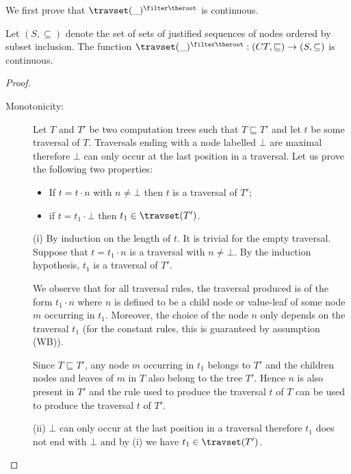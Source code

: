 We first prove that $\travset(\_)^{\filter \theroot}$ is continuous.
\begin{lemma}
\label{lem:travred_continuous} Let $(S,\subseteq)$ denote the set of
sets of justified sequences of nodes ordered by subset inclusion.
The function $\travset(\_)^{\filter \theroot} : (CT,\sqsubseteq)
\rightarrow (S,\subseteq)$ is continuous.
\end{lemma}
\begin{proof} \
    \begin{description}
    \item[Monotonicity:] Let $T$ and $T'$ be two computation trees such that $T \sqsubseteq T'$
    and let $t$ be some traversal of $T$.
    Traversals ending with a node labelled $\bot$ are maximal therefore $\bot$ can only occur
    at the last position in a traversal. Let us prove the following two properties:
        \begin{itemize}
            \item[(i)]  If $t = t \cdot n$ with $n\neq \bot$ then $t$ is a traversal of $T'$;
            \item[(ii)] if $t= t_1 \cdot \bot$ then $t_1\in \travset(T')$.
        \end{itemize}

        (i) By induction on the length of $t$. It is trivial for the empty traversal.
            Suppose that $t = t_1 \cdot n$ is a traversal with $n \neq \bot$.
            By the induction hypothesis, $t_1$ is a traversal of $T'$.

            We observe that for all traversal rules, the traversal produced is of the form $t_1 \cdot n$ where
            $n$ is defined to be a child node or value-leaf of some node $m$ occurring in $t_1$.
            Moreover, the choice of the node $n$ only depends on the traversal $t_1$
            (for the constant rules, this is guaranteed by assumption (WB)).

            Since $T \sqsubseteq T'$, any node $m$ occurring in $t_1$ belongs
            to $T'$ and the children nodes and leaves of $m$ in $T$ also belong to the tree $T'$.
            Hence $n$ is also present in $T'$ and the rule used to produce the traversal $t$ of $T$
            can be used to produce the traversal $t$ of $T'$.

        (ii) $\bot$ can only occur at the last position in a traversal
        therefore $t_1$ does not end with $\bot$ and by (i) we have $t_1\in \travset(T')$.
\vspace{6pt}


\end{description}
\end{proof}
